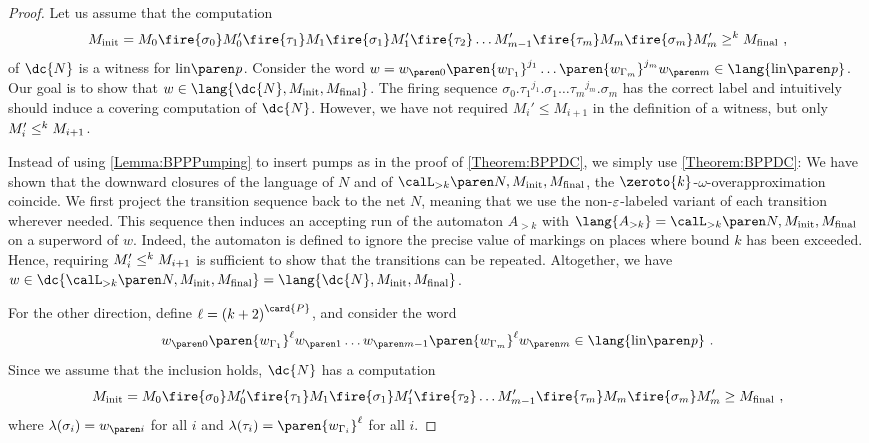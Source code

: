 \documentclass[../../diss.tex]{subfiles}
\begin{document}
\begin{proof}
    Let us assume that the computation
    \[
        \Minit
        =
        M_0 \fire{\sigma_0} M_0'
        \fire{\tau_1}
        M_1 \fire{\sigma_1} M_1'
        \fire{\tau_2}
        \ldots
        M_{m-1}'
        \fire{\tau_{m}}
        M_m \fire{\sigma_m} M_m'
        \geqk \Mfinal
        \ ,
    \]
    of $\mathmbox{\dc{N}}$ is a witness for $\linof{\product}$.
    Consider the word
    $w = \dtr{w}{0} \paren{w_{\Gamma_1}}^{j_1} \ldots \paren{w_{\Gamma_m}}^{j_m} \dtr{w}{m} \in \lang{\linof{\product}}$.
    Our goal is to show that $w \in \lang{\dc{N},\Minit,\Mfinal}$.
    The firing sequence $\sigma_0 . {\tau_1}^{j_1} . \sigma_1 \ldots {\tau_m}^{j_m} . \sigma_m$ has the correct label and intuitively should induce a covering computation of $\dc{N}$.
    However, we have not required $M_i'\leq M_{i+1}$ in the definition of a witness, but only $M_i'\leq^k M_{i+1}$.

    Instead of using \cref{Lemma:BPPPumping} to insert pumps as in the proof of \cref{Theorem:BPPDC}, we simply use \cref{Theorem:BPPDC}:
    We have shown that the downward closures of the language of $N$ and of $\langoak{k}{N,\Minit,\Mfinal}$, the $\zeroto{k}$-$\omega$-overapproximation coincide.
    We first project the transition sequence back to the net $N$, meaning that we use the non-$\varepsilon$-labeled variant of each transition wherever needed.
    This sequence then induces an accepting run of the automaton $A_{>k}$ with $\lang{A_{>k}} = \langoak{k}{N,\Minit,\Mfinal}$ on a superword of $w$.
    Indeed, the automaton is defined to ignore the precise value of markings on places where bound $k$ has been exceeded.
    Hence, requiring $M_i'\leq^k M_{i+1}$ is sufficient to show that the transitions can be repeated.
    Altogether, we have $w \in \dc{\langoak{k}{N,\Minit,\Mfinal}} = \lang{\dc{N},\Minit,\Mfinal}$.

    For the other direction, define $\ell = {(k+2)}^{\card{P}}$,
    and consider the word
    \[
        \dtr{w}{0} \paren{w_{\Gamma_1}}^{\ell} \dtr{w}{1} \ldots \dtr{w}{m-1} \paren{w_{\Gamma_m}}^{\ell} \dtr{w}{m}
        \in \lang{\linof{\product}}
        \ .
    \]
    Since we assume that the inclusion holds, $\dc{N}$ has a computation
    \[
        \Minit
        =
        M_0 \fire{\sigma_0} M_0'
        \fire{\tau_1}
        M_1 \fire{\sigma_1} M_1'
        \fire{\tau_2}
        \ldots
        M_{m-1}'
        \fire{\tau_{m}}
        M_m \fire{\sigma_m} M_m' \geq \Mfinal
        \ ,
    \]
    where $\lambda(\sigma_i) = \dtr{w}{i}$ for all $i$ and $\lambda(\tau_i) = \paren{w_{\Gamma_i}}^{\ell}$ for all $i$.


\end{proof}
\end{document}
